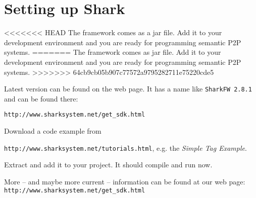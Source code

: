 \chapter{Setting up Shark}
<<<<<<< HEAD
The framework comes as a jar file. Add it to your development environment and you are ready for programming semantic P2P systems. 
=======
The framework comes as jar file. Add it to your development environment and you are ready for programming semantic P2P systems. 
>>>>>>> 64cb9cb05b907c77572a9795282711e75220cde5

Latest version can be found on the web page. It has a name like
{\verb|SharkFW 2.8.1|} and can be found there:

{\verb|http://www.sharksystem.net/get_sdk.html|}

Download a code example from 

{\verb|http://www.sharksystem.net/tutorials.html|}, e.g.
the {\it Simple Tag Example}.

Extract and add it to your project. It should compile and run now.

More -- and maybe more current -- information can be found at our web page:
{\tt http://www.sharksystem.net/get\_sdk.html} 
